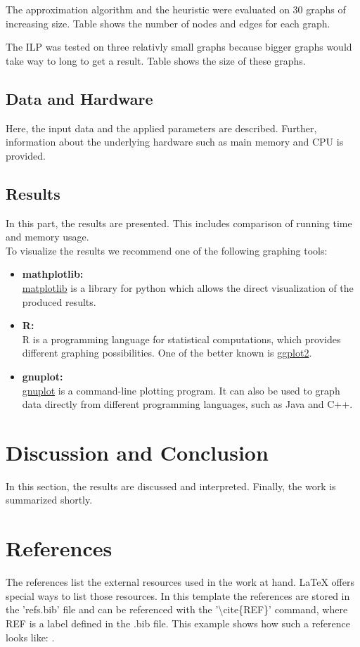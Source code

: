 \documentclass[twocolumn]{article}
\begin{document}
The approximation algorithm and the heuristic were evaluated on 30 graphs of increasing size. 
Table  shows the number of nodes and edges for each graph.

The ILP was tested on three relativly small graphs because bigger graphs would take way to long to get a result.
Table  shows the size of these graphs.

\subsection{Data and Hardware}%
\label{sub:Data and Hardware}
Here, the input data and the applied parameters are described. Further, information about the underlying hardware such as main memory and CPU is provided.

\subsection{Results}%
\label{sub:Results}
In this part, the results are presented. This includes comparison of running time and memory usage.\\
To visualize the results we recommend one of the following graphing tools:
\begin{itemize}
	\item \textbf{mathplotlib:}\\ 
		\href{https://matplotlib.org/}{matplotlib} is a library for python which allows the direct visualization of the produced results.
	\item \textbf{R:}\\
		R is a programming language for statistical computations, which provides different graphing possibilities. One of the better known is \href{https://ggplot2.tidyverse.org/}{ggplot2}.
	\item \textbf{gnuplot:}\\
		\href{http://www.gnuplot.info/}{gnuplot} is a command-line plotting program. It can also be used to graph data directly from different programming languages, such as Java and C++.
\end{itemize}

\section{Discussion and Conclusion}
In this section, the results are discussed and interpreted. Finally, the work is summarized shortly.

\section{References}
The references list the external resources used in the work at hand. \LaTeX$ $  offers special ways to list those resources. In this template the references are stored in the 'refs.bib' file and can be referenced with the '\textbackslash$ $cite\{REF\}' command, where REF is a label defined in the .bib file. This example shows how such a reference looks like: \cite{exa}.



\end{document}
